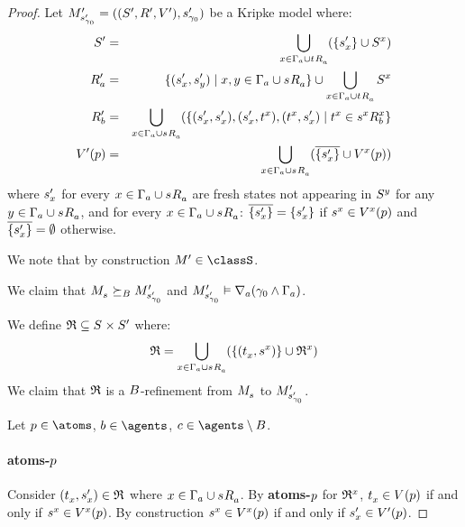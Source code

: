 \begin{proof}
Let $\kPModelAndTupleP{\kStateSP_{\gamma_0}}$ be a Kripke model where:
\begin{eqnarray*}
    \kStatesP &=& \bigcup_{x \in \Gamma_\agentA \cup \kSuccessorsA{\kStateT}} (\{\kStateSP_x\} \cup \kStates[x])\\
    \kAccessibilityPA &=& \{(\kStateSP_x, \kStateSP_y) \mid x, y \in \Gamma_\agentA \cup \kSuccessorsA{\kStateS}\} \cup \bigcup_{x \in \Gamma_\agentA \cup \kSuccessorsA{\kStateT}} \kStates[x]\\
    \kAccessibilityPB &=& \bigcup_{x \in \Gamma_\agentA \cup \kSuccessorsA{\kStateS}} (\{(\kStateSP_x, \kStateSP_x), (\kStateSP_x, \kStateT[x]), (\kStateT[x], \kStateSP_x) \mid \kStateT[x] \in \kSuccessorsB[x]{\kStateS[x]}\}\\
    \kValuationP(\atomP) &=& \bigcup_{x \in \Gamma_\agentA \cup \kSuccessorsA{\kStateS}} (\overline{\{\kStateSP_x\}} \cup \kValuation[x](\atomP))
\end{eqnarray*}
where $\kStateSP_x$ for every $x \in \Gamma_\agentA \cup \kSuccessorsA{\kStateS}$ are fresh states not appearing in $\kStates[y]$ for any $y \in \Gamma_\agentA \cup \kSuccessorsA{\kStateS}$, and for every $x \in \Gamma_\agentA \cup \kSuccessorsA{\kStateS}$: $\overline{\{\kStateSP_x\}} = \{\kStateSP_x\}$ if $\kStateS[x] \in \kValuation[x](\atomP)$ and $\overline{\{\kStateSP_x\}} = \emptyset$ otherwise.

We note that by construction $\kModelP \in \classS$.

We claim that $\kPModel{\kStateS} \simulatesBs \kPModelP{\kStateSP_{\gamma_0}}$ and $\kPModelP{\kStateSP_{\gamma_0}} \entails \coversA (\gamma_0 \land \Gamma_\agentA)$.

We define $\refinement \subseteq \kStates \times \kStatesP$ where:
$$
\refinement = \bigcup_{x \in \Gamma_\agentA \cup \kSuccessorsA{\kStateS}} (\{(\kStateT_x, \kStateS[x])\} \cup \refinement^x)
$$
We claim that $\refinement$ is a $\agentsB$-refinement from $\kPModel{\kStateS}$ to $\kPModelP{\kStateSP_{\gamma_0}}$.

Let $\atomP \in \atoms$, $\agentB \in \agents$, $\agentC \in \agents \setminus \agentsB$.

\paragraph{atoms-$\atomP$}
Consider $(\kStateT_x, \kStateSP_x) \in \refinement$ where $x \in \Gamma_\agentA \cup \kSuccessorsA{\kStateS}$.
By {\bf atoms-$\atomP$} for $\refinement^x$, $\kStateT_x \in \kValuation(\atomP)$ if and only if $\kStateS[x] \in \kValuation[x](\atomP)$.
By construction $\kStateS[x] \in \kValuation[x](\atomP)$ if and only if $\kStateSP_x \in \kValuationP(\atomP)$.


\end{proof}
